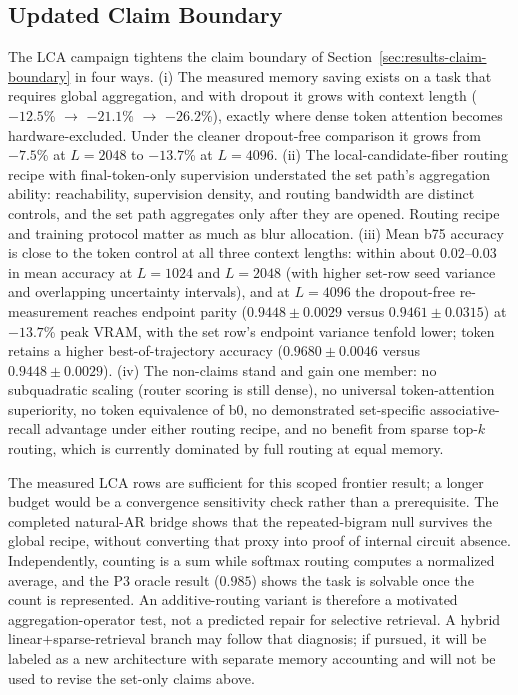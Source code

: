 \documentclass{article}
\theoremstyle{plain}
\theoremstyle{definition}
\theoremstyle{remark}
\begin{document}
\subsection{Updated Claim Boundary}
\label{sec:results-lca-claim-boundary}

The LCA campaign tightens the claim boundary of
Section~\ref{sec:results-claim-boundary} in four ways.  (i) The measured memory
saving exists on a task that requires global aggregation, and with dropout it
grows with context length ($-12.5$\% $\to$ $-21.1$\% $\to$ $-26.2$\%), exactly
where dense token attention becomes hardware-excluded.  Under the cleaner
dropout-free comparison it grows from $-7.5$\% at $L=2048$ to $-13.7$\% at
$L=4096$.  (ii) The local-candidate-fiber routing recipe with final-token-only
supervision understated the set path's aggregation ability: reachability,
supervision density, and routing bandwidth are distinct controls, and the set
path aggregates only after they are opened.  Routing recipe and training
protocol matter as much as blur allocation.  (iii) Mean b75 accuracy is close
to the token control at all three context lengths: within about $0.02$--$0.03$ in mean
accuracy at $L=1024$ and $L=2048$ (with higher set-row seed variance and
overlapping uncertainty intervals), and at $L=4096$ the dropout-free re-measurement
reaches endpoint parity ($0.9448\pm0.0029$ versus $0.9461\pm0.0315$) at
$-13.7$\% peak VRAM, with the set row's endpoint variance tenfold lower;
token retains a higher best-of-trajectory accuracy ($0.9680\pm0.0046$ versus
$0.9448\pm0.0029$).  (iv) The
non-claims stand and gain one member: no subquadratic scaling (router scoring
is still dense), no universal token-attention superiority, no token
equivalence of b0, no demonstrated set-specific associative-recall advantage
under either routing recipe, and no benefit from sparse top-$k$ routing, which
is currently dominated by full routing at equal memory.

The measured LCA rows are sufficient for this scoped frontier result; a longer
budget would be a convergence sensitivity check rather than a prerequisite.
The completed natural-AR bridge shows that the repeated-bigram null survives
the global recipe, without converting that proxy into proof of internal circuit
absence.  Independently, counting is a sum while softmax routing computes a
normalized average, and the P3 oracle result ($0.985$) shows the task is
solvable once the count is represented.  An additive-routing variant is
therefore a motivated aggregation-operator test, not a predicted repair for
selective retrieval.  A hybrid linear$+$sparse-retrieval
branch may follow that diagnosis; if pursued, it will be labeled as a new
architecture with separate memory accounting and will not be used to revise
the set-only claims above.
\end{document}
